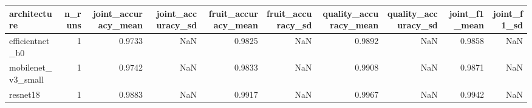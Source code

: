 \begin{tabular}{lrrrrrrrrr}
\toprule
architecture & n_runs & joint_accuracy_mean & joint_accuracy_sd & fruit_accuracy_mean & fruit_accuracy_sd & quality_accuracy_mean & quality_accuracy_sd & joint_f1_mean & joint_f1_sd \\
\midrule
efficientnet_b0 & 1 & 0.9733 & NaN & 0.9825 & NaN & 0.9892 & NaN & 0.9858 & NaN \\
mobilenet_v3_small & 1 & 0.9742 & NaN & 0.9833 & NaN & 0.9908 & NaN & 0.9871 & NaN \\
resnet18 & 1 & 0.9883 & NaN & 0.9917 & NaN & 0.9967 & NaN & 0.9942 & NaN \\
\bottomrule
\end{tabular}
